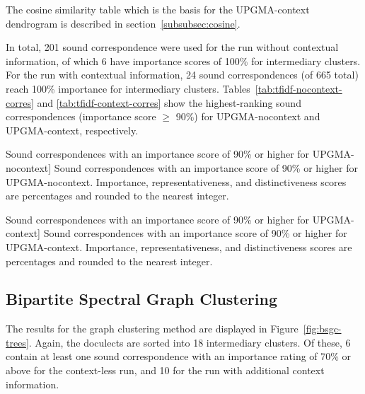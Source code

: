 \documentclass[a4paper]{article}
\begin{document}
The cosine similarity table which is
the basis for the UPGMA-context dendrogram
is described in section~\ref{subsubsec:cosine}.

In total, 201 sound correspondence were used for the run without contextual information,
of which 6 have importance scores of 100\% for intermediary clusters.
For the run with contextual information,
24 sound correspondences (of 665 total) reach 100\% importance for intermediary clusters.
Tables~\ref{tab:tfidf-nocontext-corres} and \ref{tab:tfidf-context-corres}
show the highest-ranking sound correspondences (importance score $\geq$ 90\%)
for UPGMA-nocontext and UPGMA-context, respectively.

\begin{table}[h]
\begin{adjustwidth}{-1cm}{-1cm}
\centering

\end{adjustwidth}
\caption
[Sound correspondences with an importance score of 90\% or higher for UPGMA-nocontext]
{Sound correspondences with an importance score of 90\% or higher for UPGMA-nocontext.
Importance, representativeness, and distinctiveness scores are percentages
and rounded to the nearest integer.
}
\label{tab:tfidf-nocontext-corres}
\end{table}

\begin{table}[h]
\begin{adjustwidth}{-1cm}{-1cm}
\centering

\end{adjustwidth}
\caption
[Sound correspondences with an importance score of 90\% or higher for UPGMA-context]
{Sound correspondences with an importance score of 90\% or higher for UPGMA-context.
Importance, representativeness, and distinctiveness scores are percentages
and rounded to the nearest integer.
}
\label{tab:tfidf-context-corres}
\end{table}
\FloatBarrier

\subsection{Bipartite Spectral Graph Clustering}

The results for the graph clustering method are
displayed in Figure~\ref{fig:bsgc-trees}.
Again, the doculects are sorted into 18 intermediary clusters.
Of these, 6 contain at least one sound correspondence
with an importance rating of 70\% or above for the context-less run,
and 10 for the run with additional context information.
\end{document}
